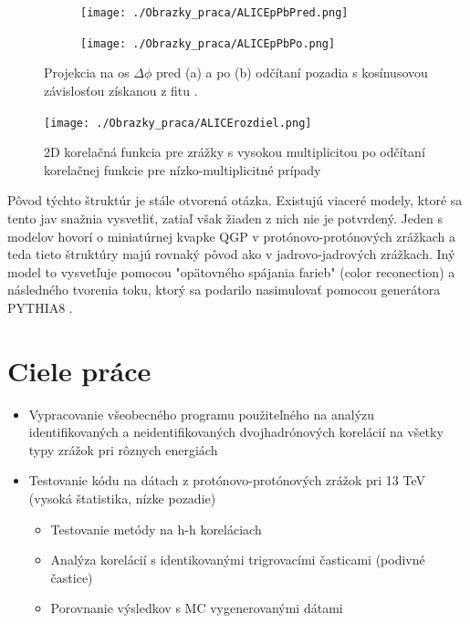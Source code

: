 \documentclass[thesismargins, thesislinespacing]{rnthesis}
\begin{document}
\begin{figure}[hbtp!]
	\centering
	\begin{subfigure}{0.5\textwidth}
		\centering
		\texttt{[image: ./Obrazky\_praca/ALICEpPbPred.png]}
		\caption{}
		\label{ALICEpPBPhiPred}
	\end{subfigure}%
	\begin{subfigure}{0.5\textwidth}
		\centering
		\texttt{[image: ./Obrazky\_praca/ALICEpPbPo.png]}
		\caption{}
		\label{ALICEpPBPhiPo}
	\end{subfigure}
	\caption{Projekcia na os $\Delta \phi$ pred (a) a po (b) odčítaní pozadia s kosínusovou závislosťou získanou z fitu \cite{AlicepPb}.}
\end{figure}

\begin{figure}[hbtp!]
	\centering
	\texttt{[image: ./Obrazky\_praca/ALICErozdiel.png]}
	
	\caption{2D korelačná funkcia pre zrážky s vysokou multiplicitou po odčítaní korelačnej funkcie pre nízko-multiplicitné prípady \cite{AlicepPb}}
	\label{ALICErozdiel}
\end{figure}
Pôvod týchto štruktúr je stále otvorená otázka. Existujú viaceré modely, ktoré sa tento jav snažnia vysvetliť, zatiaľ však žiaden z nich nie je potvrdený. Jeden s modelov hovorí o miniatúrnej kvapke QGP v protónovo-protónových zrážkach a teda tieto štruktúry majú rovnaký pôvod ako v jadrovo-jadrových zrážkach. Iný model to vysvetľuje pomocou "opätovného spájania farieb" (color reconection) a  následného tvorenia toku, ktorý sa podarilo nasimulovať pomocou generátora PYTHIA8 \cite{flowPP}.

\chapter{Ciele práce} 
\begin{itemize}
	\item Vypracovanie všeobecného programu použiteľného na analýzu identifikovaných a neidentifikovaných dvojhadrónových korelácií na všetky typy zrážok pri rôznych energiách
	\item Testovanie kódu na dátach z protónovo-protónových zrážok pri 13 TeV (vysoká štatistika, nízke pozadie)
	\begin{itemize}
		\item Testovanie metódy na h-h koreláciach
		\item Analýza korelácií s identikovanými trigrovacími časticami (podivné častice)
		\item Porovnanie výsledkov s MC vygenerovanými dátami 
	\end{itemize}
\end{itemize}
\end{document}
